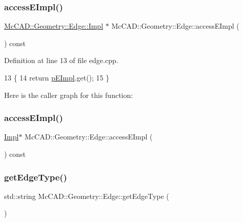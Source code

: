 \subsubsection{\texorpdfstring{access\+E\+Impl()}{accessEImpl()}\hspace{0.1cm}{\footnotesize\ttfamily [1/2]}}
{\footnotesize\ttfamily \hyperlink{classMcCAD_1_1Geometry_1_1Edge_1_1Impl}{Mc\+C\+A\+D\+::\+Geometry\+::\+Edge\+::\+Impl} $\ast$ Mc\+C\+A\+D\+::\+Geometry\+::\+Edge\+::access\+E\+Impl (\begin{DoxyParamCaption}{ }\end{DoxyParamCaption}) const}



Definition at line 13 of file edge.\+cpp.


\begin{DoxyCode}
13                                     \{
14   \textcolor{keywordflow}{return} \hyperlink{classMcCAD_1_1Geometry_1_1Edge_aefb1a25627999c87d4984bb505550626}{pEImpl}.get();
15 \}
\end{DoxyCode}
Here is the caller graph for this function\+:
\mbox{\label{classMcCAD_1_1Geometry_1_1Edge_a9e5a6133097a8cff17490aca6900514d}} 
\subsubsection{\texorpdfstring{access\+E\+Impl()}{accessEImpl()}\hspace{0.1cm}{\footnotesize\ttfamily [2/2]}}
{\footnotesize\ttfamily \hyperlink{classMcCAD_1_1Geometry_1_1Edge_1_1Impl}{Impl}$\ast$ Mc\+C\+A\+D\+::\+Geometry\+::\+Edge\+::access\+E\+Impl (\begin{DoxyParamCaption}{ }\end{DoxyParamCaption}) const}

\mbox{\label{classMcCAD_1_1Geometry_1_1Edge_ac5181adb5c133b971a23a7a87d9c8d39}} 
\subsubsection{\texorpdfstring{get\+Edge\+Type()}{getEdgeType()}\hspace{0.1cm}{\footnotesize\ttfamily [1/2]}}
{\footnotesize\ttfamily std\+::string Mc\+C\+A\+D\+::\+Geometry\+::\+Edge\+::get\+Edge\+Type (\begin{DoxyParamCaption}{ }\end{DoxyParamCaption})}



